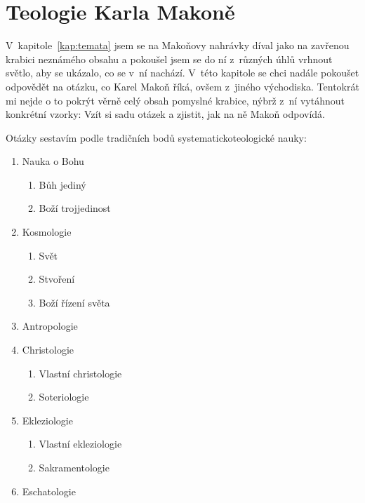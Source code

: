 \chapter{Teologie Karla Makoně}
\label{kap:teologie}

V~kapitole~\ref{kap:temata} jsem se na Makoňovy nahrávky díval jako na zavřenou
krabici neznámého obsahu a pokoušel jsem se do ní z~různých úhlů vrhnout světlo,
aby se ukázalo, co se v~ní nachází. V~této kapitole se chci nadále pokoušet
odpovědět na otázku, co Karel Makoň říká, ovšem z~jiného východiska. Tentokrát
mi nejde o to pokrýt věrně celý obsah pomyslné krabice, nýbrž z~ní vytáhnout
konkrétní vzorky: Vzít si sadu otázek a zjistit, jak na ně Makoň odpovídá.

Otázky sestavím podle tradičních bodů systematicko\-teologické nauky:
\begin{enumerate}
    \item{%
        Nauka o Bohu
        \begin{enumerate}
            \item{Bůh jediný}
            \item{Boží trojjedinost}
        \end{enumerate}
    }
    \item{%
        Kosmologie
        \begin{enumerate}
            \item{Svět}
            \item{Stvoření}
            \item{Boží řízení světa}
        \end{enumerate}
    }
    \item{Antropologie}
    \item{%
        Christologie
        \begin{enumerate}
            \item{Vlastní christologie}
            \item{Soteriologie}
        \end{enumerate}
    }
    \item{%
        Ekleziologie
        \begin{enumerate}
            \item{Vlastní ekleziologie}
            \item{Sakramentologie}
        \end{enumerate}
    }
    \item{Eschatologie}
\end{enumerate}

